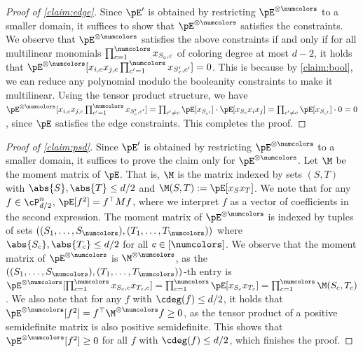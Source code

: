 \begin{proof}[Proof of \cref{claim:edge}]
Since $\pE'$ is obtained by restricting $\pE^{\otimes \numcolors}$ to a smaller domain, it suffices to show that $\pE^{\otimes \numcolors}$ satisfies the constraints. We observe that $\pE^{\otimes \numcolors}$ satisfies the above constraints if and only if for all multilinear monomials $\prod_{c = 1}^\numcolors x_{S_c,c}$ of coloring degree at most $d-2$, it holds that $\pE^{\otimes \numcolors} [x_{i,c} x_{j,c} \prod_{c' = 1}^\numcolors x_{S_c', c'}] = 0$. This is because by \cref{claim:bool}, we can reduce any polynomial modulo the booleanity constraints to make it multilinear. Using the tensor product structure, we have $\pE^{\otimes \numcolors} [x_{i,c} x_{j,c} \prod_{c' = 1}^\numcolors x_{S_c', c'}] = \prod_{c' \ne c} \pE[x_{S_{c'}}] \cdot \pE[x_{S_c} x_i x_j] = \prod_{c' \ne c} \pE[x_{S_{c'}}] \cdot 0 = 0$, since $\pE$ satisfies the edge constraints. This completes the proof.
\end{proof}

\begin{proof}[Proof of \cref{claim:psd}]
Since $\pE'$ is obtained by restricting $\pE^{\otimes \numcolors}$ to a smaller domain, it suffices to prove the claim only for $\pE^{\otimes \numcolors}$. Let $\M$ be the moment matrix of $\pE$. That is, $\M$ is the matrix indexed by sets $(S,T)$ with $\abs{S}, \abs{T} \leq d/2$ and $\M(S,T) := \pE[x_S x_T]$. We note that for any $f \in \cP^n_{d/2}$, $\pE[f^2] = f^{\top} M f$, where we interpret $f$ as a vector of coefficients in the second expression. The moment matrix of $\pE^{\otimes \numcolors}$ is indexed by tuples of sets $((S_1, \dots, S_\numcolors), (T_1, \dots, T_\numcolors))$ where $\abs{S_c}, \abs{T_c} \leq d/2$ for all $c \in [\numcolors]$. We observe that the moment matrix of $\pE^{\otimes \numcolors}$ is $\M^{\otimes \numcolors}$, as the $((S_1, \dots, S_\numcolors), (T_1, \dots, T_\numcolors))$-th entry is $\pE^{\otimes \numcolors}[\prod_{c = 1}^\numcolors x_{S_c, c} x_{T_c, c}] = \prod_{c = 1}^\numcolors \pE[x_{S_c} x_{T_c}] = \prod_{c = 1}^\numcolors \M(S_c, T_c)$. We also note that for any $f$ with $\cdeg(f) \leq d/2$, it holds that $\pE^{\otimes \numcolors}[f^2]  = f^{\top} \M^{\otimes \numcolors}f \geq 0$, as the tensor product of a positive semidefinite matrix is also positive semidefinite. This shows that $\pE^{\otimes \numcolors}[f^2] \geq 0$ for all $f$ with $\cdeg(f) \leq d/2$, which finishes the proof.
\end{proof}



